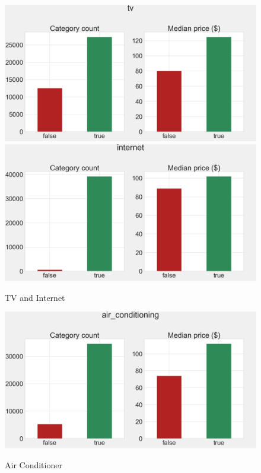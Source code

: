 \begin{figure}[H]
\centering
\caption{TV and Internet}
    \includegraphics[width=\linewidth]{figures/amenities/group2/tv.png}
    \vspace{0.5cm}
    \includegraphics[width=\linewidth]{figures/amenities/group2/internet.png}
    \label{fig:tv-and-internet}
\end{figure}

\begin{figure}[H]
\centering
    \caption{Air Conditioner}
    \includegraphics[width=\linewidth]{figures/amenities/group2/air_conditioning.png}
    \label{fig:air-conditioner}
\end{figure}

